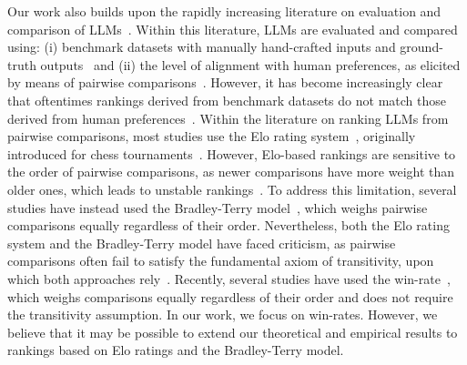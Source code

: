 Our work also builds upon the rapidly increasing literature on evaluation and comparison of LLMs~\cite{chang2024asurvey}. 
%
Within this literature, LLMs are evaluated and compared using: 
%
(i) benchmark datasets with manually hand-crafted inputs and ground-truth outputs~\cite{bach2022promptsource,wei2022finetuned,talmor2019commonsense,mishra2022cross,chen2021evaluating,liang2023holistic,longpre2023flan} and (ii) the level of alignment with human preferences, as elicited by means of pairwise comparisons~\cite{taori2023stanford,zheng2023judging,li2023generative,li2023prd,boubdir2023elo,singhal2023large,chiang2024chatbot}.
%
However, it has become increasingly clear that oftentimes rankings derived from benchmark datasets do not match those derived from human preferences~\cite{zheng2023judging,li2023generative,li2023prd,chiang2023vicuna,chiang2024chatbot}.
%
Within the literature on ranking LLMs from pairwise comparisons, most studies use the Elo rating system~\cite{askell2021general,dettmers2024qlora,bai2022training,wu2023chatarena,lin2023llm}, originally introduced for chess tournaments~\cite{elo1966uscf}. 
%
However, Elo-based rankings are sensitive to the order of pairwise comparisons, as newer comparisons have more weight than older ones, which leads to unstable rankings~\cite{boubdir2023elo}.
%
To address this limitation, several studies have instead used the Bradley-Terry model~\cite{chiang2024chatbot,boyeau2024autoeval}, which weighs pairwise comparisons equally regardless of their order. %
%
Nevertheless, both the Elo rating system and the Bradley-Terry model have faced criticism, 
%
as pairwise comparisons often fail to satisfy the fundamental axiom of transitivity, 
%
upon which both approaches rely~\cite{boubdir2023elo,bertrand2023limitations}. 
%
Recently, several studies have used the win-rate~\cite{zheng2023judging,chiang2024chatbot,boyeau2024autoeval}, which weighs comparisons equally regardless of their order and does not require the transitivity assumption.
%
In our work, we focus on win-rates. However, we believe that it may be possible to extend our theoretical and empirical results to rankings based on Elo ratings and the Bradley-Terry model.